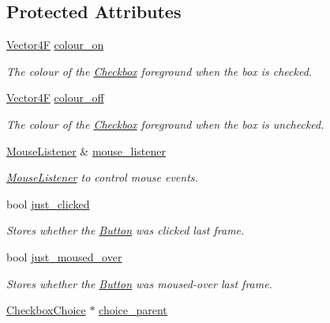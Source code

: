 \subsection*{Protected Attributes}
\begin{DoxyCompactItemize}
\item 
\mbox{\label{class_checkbox_adf8806f2b48dfe1d415d108f3ef5bc8c}} 
\mbox{\hyperlink{class_vector4}{Vector4F}} \mbox{\hyperlink{class_checkbox_adf8806f2b48dfe1d415d108f3ef5bc8c}{colour\+\_\+on}}
\begin{DoxyCompactList}\small\item\em The colour of the \mbox{\hyperlink{class_checkbox}{Checkbox}} foreground when the box is checked. \end{DoxyCompactList}\item 
\mbox{\label{class_checkbox_a09f7af816849a1b505af2e746847fcc4}} 
\mbox{\hyperlink{class_vector4}{Vector4F}} \mbox{\hyperlink{class_checkbox_a09f7af816849a1b505af2e746847fcc4}{colour\+\_\+off}}
\begin{DoxyCompactList}\small\item\em The colour of the \mbox{\hyperlink{class_checkbox}{Checkbox}} foreground when the box is unchecked. \end{DoxyCompactList}\item 
\mbox{\label{class_checkbox_a7cf00bf1e5b41dcf590e7e836e937ead}} 
\mbox{\hyperlink{class_mouse_listener}{Mouse\+Listener}} \& \mbox{\hyperlink{class_checkbox_a7cf00bf1e5b41dcf590e7e836e937ead}{mouse\+\_\+listener}}
\begin{DoxyCompactList}\small\item\em \mbox{\hyperlink{class_mouse_listener}{Mouse\+Listener}} to control mouse events. \end{DoxyCompactList}\item 
\mbox{\label{class_checkbox_af3cb6394e0b1d37a504ff4eaca946aa8}} 
bool \mbox{\hyperlink{class_checkbox_af3cb6394e0b1d37a504ff4eaca946aa8}{just\+\_\+clicked}}
\begin{DoxyCompactList}\small\item\em Stores whether the \mbox{\hyperlink{class_button}{Button}} was clicked last frame. \end{DoxyCompactList}\item 
\mbox{\label{class_checkbox_afbbde2ae6d330fb75a26210642407b1f}} 
bool \mbox{\hyperlink{class_checkbox_afbbde2ae6d330fb75a26210642407b1f}{just\+\_\+moused\+\_\+over}}
\begin{DoxyCompactList}\small\item\em Stores whether the \mbox{\hyperlink{class_button}{Button}} was moused-\/over last frame. \end{DoxyCompactList}\item 
\mbox{\hyperlink{class_checkbox_choice}{Checkbox\+Choice}} $\ast$ \mbox{\hyperlink{class_checkbox_adf30cd14778fdae212e6c97ec456a700}{choice\+\_\+parent}}
\end{DoxyCompactItemize}
